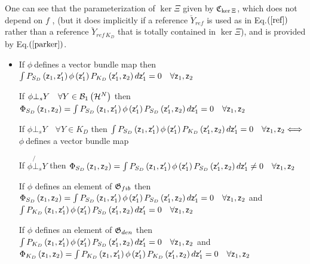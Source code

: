 One can see that the parameterization of $\ker \Xi $ given by ${\frak C}%
_{\ker \Xi }$, which does not depend on $f$ , (but it does implicitly if a
reference $\breve{Y}_{ref}$ is used as in Eq.$\left( \ref{ref}\right) $
rather than a reference $\breve{Y}_{ref\,K_{D}}$ that is totally contained
in $\ker \Xi $), and is provided by Eq.$\left( \ref{parker}\right) $.

\begin{itemize}
\item If $\phi \ $defines a vector bundle map then $\int P_{S_{D}}\left( 
{\sf z}_{1},{\sf z}_{1}^{\prime }\right) \phi \left( {\sf z}_{1}^{\prime
}\right) P_{K_{D}}\left( {\sf z}_{1}^{\prime },{\sf z}_{2}\right) d{\sf z}%
_{1}^{\prime }=0\quad \forall {\sf z}_{1},{\sf z}_{2}$

If $\phi \bot _{s}Y\quad \forall Y\in {\cal B}_{1}\left( {\cal H}^{N}\right) 
$ then $\Phi _{S_{D}}\left( {\sf z}_{1},{\sf z}_{2}\right) =\int
P_{S_{D}}\left( {\sf z}_{1},{\sf z}_{1}^{\prime }\right) \phi \left( {\sf z}%
_{1}^{\prime }\right) P_{S_{D}}\left( {\sf z}_{1}^{\prime },{\sf z}%
_{2}\right) d{\sf z}_{1}^{\prime }=0\quad \forall {\sf z}_{1},{\sf z}_{2}$

If $\phi \bot _{s}Y\quad \forall Y\in K_{D}$ then $\int P_{S_{D}}\left( {\sf %
z}_{1},{\sf z}_{1}^{\prime }\right) \phi \left( {\sf z}_{1}^{\prime }\right)
P_{K_{D}}\left( {\sf z}_{1}^{\prime },{\sf z}_{2}\right) d{\sf z}%
_{1}^{\prime }=0\quad \forall {\sf z}_{1},{\sf z}_{2}\Longleftrightarrow $ $%
\phi \ $defines a vector bundle map

If $\phi \not{\bot}_{s}Y$ then $\Phi _{S_{D}}\left( {\sf z}_{1},{\sf z}%
_{2}\right) =\int P_{S_{D}}\left( {\sf z}_{1},{\sf z}_{1}^{\prime }\right)
\phi \left( {\sf z}_{1}^{\prime }\right) P_{S_{D}}\left( {\sf z}_{1}^{\prime
},{\sf z}_{2}\right) d{\sf z}_{1}^{\prime }\neq 0\quad \forall {\sf z}_{1},%
{\sf z}_{2}$

If $\phi $ defines an element of ${\frak G}_{fib}$ then $\Phi _{S_{D}}\left( 
{\sf z}_{1},{\sf z}_{2}\right) =\int P_{S_{D}}\left( {\sf z}_{1},{\sf z}%
_{1}^{\prime }\right) \phi \left( {\sf z}_{1}^{\prime }\right)
P_{S_{D}}\left( {\sf z}_{1}^{\prime },{\sf z}_{2}\right) d{\sf z}%
_{1}^{\prime }=0\quad \forall {\sf z}_{1},{\sf z}_{2}$ and $\int
P_{K_{D}}\left( {\sf z}_{1},{\sf z}_{1}^{\prime }\right) \phi \left( {\sf z}%
_{1}^{\prime }\right) P_{S_{D}}\left( {\sf z}_{1}^{\prime },{\sf z}%
_{2}\right) d{\sf z}_{1}^{\prime }=0\quad \forall {\sf z}_{1},{\sf z}_{2}$

If $\phi $ defines an element of ${\frak G}_{den}$ then $\int
P_{K_{D}}\left( {\sf z}_{1},{\sf z}_{1}^{\prime }\right) \phi \left( {\sf z}%
_{1}^{\prime }\right) P_{S_{D}}\left( {\sf z}_{1}^{\prime },{\sf z}%
_{2}\right) d{\sf z}_{1}^{\prime }=0\quad \forall {\sf z}_{1},{\sf z}_{2}$
and $\Phi _{K_{D}}\left( {\sf z}_{1},{\sf z}_{2}\right) =\int
P_{K_{D}}\left( {\sf z}_{1},{\sf z}_{1}^{\prime }\right) \phi \left( {\sf z}%
_{1}^{\prime }\right) P_{K_{D}}\left( {\sf z}_{1}^{\prime },{\sf z}%
_{2}\right) d{\sf z}_{1}^{\prime }=0\quad \forall {\sf z}_{1},{\sf z}_{2}$


\end{itemize}
